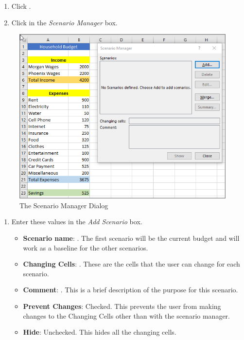 \begin{enumerate}[resume]
	\item Click .
	\item Click  in the \textit{Scenario Manager} box.
\end{enumerate}

\begin{figure}[H]
	\centering
	\includegraphics[width=\maxwidth{.95\linewidth}]{gfx/ch08_fig50}
	\caption{The Scenario Manager Dialog}
	\label{08:fig50}
\end{figure}

\begin{enumerate}[resume]	
	
	\item Enter these values in the \textit{Add Scenario} box.
	
	\begin{itemize}
		\item \textbf{Scenario name}: . The first scenario will be the current budget and will work as a baseline for the other scenarios.
		\item \textbf{Changing Cells}: . These are the cells that the user can change for each scenario.
		\item \textbf{Comment}: . This is a brief description of the purpose for this scenario.
		\item \textbf{Prevent Changes}: Checked. This prevents the user from making changes to the Changing Cells other than with the scenario manager.
		\item \textbf{Hide}: Unchecked. This hides all the changing cells.
	\end{itemize}

\end{enumerate}

